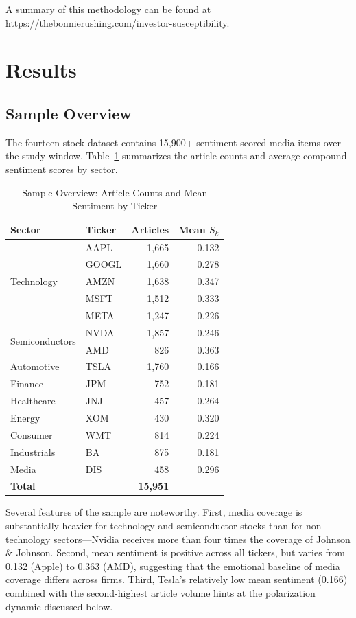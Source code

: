 \documentclass[lettersize,journal]{IEEEtran}
\begin{document}
A summary of this methodology can be found at https://thebonnierushing.com/investor-susceptibility.

\section{Results}
\label{sec:results}

\subsection{Sample Overview}
The fourteen-stock dataset contains 15{,}900+ sentiment-scored media items over the study window. Table~\ref{tab:sample_overview} summarizes the article counts and average compound sentiment scores by sector.

\begin{table}[!htbp]
\centering
\caption{Sample Overview: Article Counts and Mean Sentiment by Ticker}
\label{tab:sample_overview}
\begin{tabular}{llrr}
\toprule
\textbf{Sector} & \textbf{Ticker} & \textbf{Articles} & \textbf{Mean $\bar{S}_k$} \\
\midrule
\multirow{5}{*}{Technology} & AAPL & 1{,}665 & 0.132 \\
 & GOOGL & 1{,}660 & 0.278 \\
 & AMZN & 1{,}638 & 0.347 \\
 & MSFT & 1{,}512 & 0.333 \\
 & META & 1{,}247 & 0.226 \\
\midrule
\multirow{2}{*}{Semiconductors} & NVDA & 1{,}857 & 0.246 \\
 & AMD & 826 & 0.363 \\
\midrule
Automotive & TSLA & 1{,}760 & 0.166 \\
\midrule
Finance & JPM & 752 & 0.181 \\
\midrule
Healthcare & JNJ & 457 & 0.264 \\
\midrule
Energy & XOM & 430 & 0.320 \\
\midrule
Consumer & WMT & 814 & 0.224 \\
\midrule
Industrials & BA & 875 & 0.181 \\
\midrule
Media & DIS & 458 & 0.296 \\
\bottomrule
\multicolumn{2}{l}{\textbf{Total}} & \textbf{15{,}951} & \\
\bottomrule
\end{tabular}
\end{table}

Several features of the sample are noteworthy. First, media coverage is substantially heavier for technology and semiconductor stocks than for non-technology sectors---Nvidia receives more than four times the coverage of Johnson \& Johnson. Second, mean sentiment is positive across all tickers, but varies from 0.132 (Apple) to 0.363 (AMD), suggesting that the emotional baseline of media coverage differs across firms. Third, Tesla's relatively low mean sentiment (0.166) combined with the second-highest article volume hints at the polarization dynamic discussed below.
\end{document}
